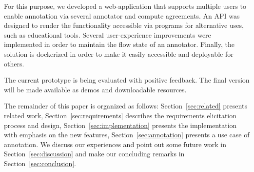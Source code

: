 For this purpose, we developed a web-application that supports multiple users to enable annotation via several annotator and compute agreements. 
An API was designed to render the functionality accessible via programs for alternative uses, such as educational tools. 
Several user-experience improvements were implemented in order to maintain the flow state of an annotator.
Finally, the solution is dockerized in order to make it easily accessible and deployable for others. 

The current prototype is being evaluated with positive feedback. 
The final version will be made available as demos and downloadable resources. 

The remainder of this paper is organized as follows: 
Section~\ref{sec:related} presents related work, 
Section~\ref{sec:requirements} describes the requirements elicitation process and design, 
Section~\ref{sec:implementation} presents the implementation with emphasis on the new features, 
Section~\ref{sec:annotation} presents a use case of annotation.
We discuss our experiences and point out some future work in Section~\ref{sec:discussion} and make our concluding remarks in Section~\ref{sec:conclusion}.
